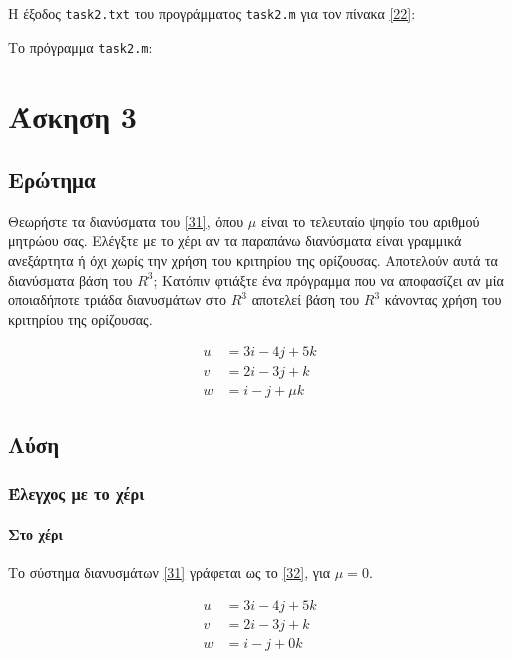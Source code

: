 \documentclass[12pt, fleqn, leqno]{extreport}
\begin{document}
Η έξοδος \lstinline[language={}]{task2.txt} του προγράμματος \lstinline[language={}]{task2.m} για τον πίνακα \eqref{22}:


Το πρόγραμμα \lstinline[language={}]{task2.m}:



\chapter{Άσκηση 3}
\section{Ερώτημα}

Θεωρήστε τα διανύσματα του \eqref{31}, όπου $\mu$ είναι το τελευταίο ψηφίο του αριθμού μητρώου σας. Ελέγξτε με το χέρι αν τα παραπάνω διανύσματα είναι γραμμικά ανεξάρτητα ή όχι χωρίς την χρήση του κριτηρίου της ορίζουσας. Αποτελούν αυτά τα διανύσματα βάση του $R^{3}$; Κατόπιν φτιάξτε ένα πρόγραμμα που να αποφασίζει αν μία οποιαδήποτε τριάδα διανυσμάτων στο $R^{3}$ αποτελεί βάση του $R^{3}$ κάνοντας χρήση του κριτηρίου της ορίζουσας.

\begin{equation}%
    \begin{aligned}
        u & = 3i - 4j + 5k  \\
        v & = 2i - 3j + k   \\
        w & = i - j + \mu k
    \end{aligned}\label{31}
\end{equation}

\newpage
\section{Λύση}
\subsection{Έλεγχος με το χέρι}
\subsubsection{Στο χέρι}

Το σύστημα διανυσμάτων \eqref{31} γράφεται ως το \eqref{32}, για $\mu = 0$.

\begin{equation}%
    \begin{aligned}
        u & = 3i - 4j + 5k \\
        v & = 2i - 3j + k  \\
        w & = i - j + 0k
    \end{aligned}\label{32}
\end{equation}
\end{document}
